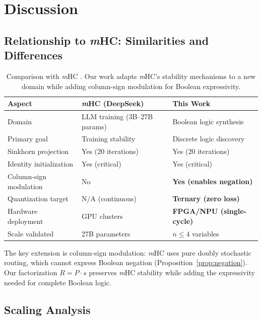 \documentclass[Royal,times,sageh]{sagej}
\newcommand{\mHC}{\textit{m}HC}
\begin{document}
\section{Discussion}

\subsection{Relationship to \mHC: Similarities and Differences}

\begin{table}[t]
\centering
\caption{Comparison with \mHC{} \cite{xie2024mhc}. Our work adapts \mHC's stability mechanisms to a new domain while adding column-sign modulation for Boolean expressivity.}
\label{tab:mhc_comparison}
\small
\begin{tabular}{lll}
\toprule
\textbf{Aspect} & \textbf{\mHC{} (DeepSeek)} & \textbf{This Work} \\
\midrule
Domain & LLM training (3B--27B params) & Boolean logic synthesis \\
Primary goal & Training stability & Discrete logic discovery \\
Sinkhorn projection & Yes (20 iterations) & Yes (20 iterations) \\
Identity initialization & Yes (critical) & Yes (critical) \\
Column-sign modulation & No & \textbf{Yes (enables negation)} \\
Quantization target & N/A (continuous) & \textbf{Ternary (zero loss)} \\
Hardware deployment & GPU clusters & \textbf{FPGA/NPU (single-cycle)} \\
Scale validated & 27B parameters & $n \leq 4$ variables \\
\bottomrule
\end{tabular}
\end{table}

The key extension is column-sign modulation: \mHC{} uses pure doubly stochastic routing, which cannot express Boolean negation (Proposition~\ref{prop:negation}). Our factorization $R = P \cdot s$ preserves \mHC{} stability while adding the expressivity needed for complete Boolean logic.

\subsection{Scaling Analysis}
\end{document}
